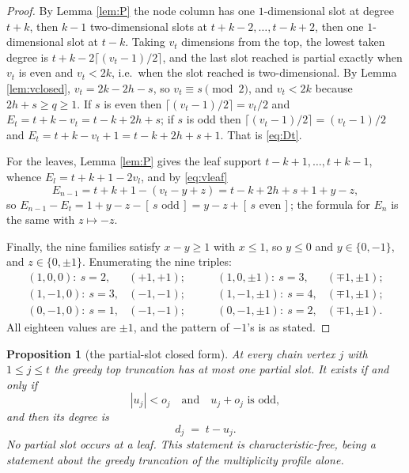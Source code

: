 \documentclass[reqno]{amsart}
\theoremstyle{plain}
\newtheorem{proposition}[theorem]{Proposition}
\theoremstyle{definition}
\begin{document}
\begin{proof}
By Lemma \ref{lem:P} the node column has one $1$-dimensional slot at degree
$t+k$, then $k-1$ two-dimensional slots at $t+k-2,\dots,t-k+2$, then one
$1$-dimensional slot at $t-k$.  Taking $v_t$ dimensions from the top, the
lowest taken degree is $t+k-2\lceil(v_t-1)/2\rceil$, and the last slot reached
is partial exactly when $v_t$ is even and $v_t<2k$, i.e.\ when the slot reached
is two-dimensional.  By Lemma \ref{lem:vclosed}, $v_t=2k-2h-s$, so $v_t\equiv s
\pmod 2$, and $v_t<2k$ because $2h+s\ge q\ge1$.  If $s$ is even then
$\lceil(v_t-1)/2\rceil=v_t/2$ and $E_t=t+k-v_t=t-k+2h+s$; if $s$ is odd then
$\lceil(v_t-1)/2\rceil=(v_t-1)/2$ and $E_t=t+k-v_t+1=t-k+2h+s+1$.  That is
\eqref{eq:Dt}.

For the leaves, Lemma \ref{lem:P} gives the leaf support
$t-k+1,\dots,t+k-1$, whence $E_l=t+k+1-2v_l$, and by \eqref{eq:vleaf}
\[
   E_{n-1}=t+k+1-(v_t-y+z)=t-k+2h+s+1+y-z,
\]
so $E_{n-1}-E_t=1+y-z-[\,s\text{ odd}\,]=y-z+[\,s\text{ even}\,]$; the formula
for $E_n$ is the same with $z\mapsto-z$.

Finally, the nine families satisfy $x-y\ge1$ with $x\le1$, so $y\le0$ and
$y\in\{0,-1\}$, and $z\in\{0,\pm1\}$.  Enumerating the nine triples:
\[
\begin{array}{llll}
(1,0,0):\ s=2,& (+1,+1);\qquad
&(1,0,\pm1):\ s=3,& (\mp1,\pm1);\\
(1,-1,0):\ s=3,& (-1,-1);
&(1,-1,\pm1):\ s=4,& (\mp1,\pm1);\\
(0,-1,0):\ s=1,& (-1,-1);
&(0,-1,\pm1):\ s=2,& (\mp1,\pm1).
\end{array}
\]
All eighteen values are $\pm1$, and the pattern of $-1$'s is as stated.
\end{proof}

\begin{proposition}[the partial-slot closed form]\label{prop:PS}
At every chain vertex $j$ with $1\le j\le t$ the greedy top truncation has
\emph{at most one} partial slot.  It exists if and only if
\[
   |u_j|<o_j \quad\text{and}\quad u_j+o_j \text{ is odd},
\]
and then its degree is
\begin{equation}\label{eq:PS}
   d_j\;=\;t-u_j .
\end{equation}
No partial slot occurs at a leaf.  This statement is characteristic-free, being
a statement about the greedy truncation of the multiplicity profile alone.
\end{proposition}
\end{document}
